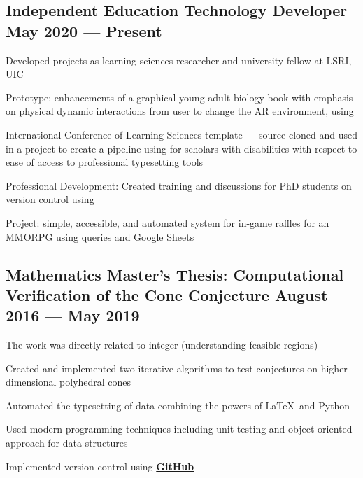 \documentclass[letter,10pt]{article}
\begin{document}
\subsection{Independent Education Technology Developer \hfill May 2020 --- Present}
\begin{zitemize}
\item Developed projects as learning sciences researcher and university fellow at LSRI, UIC
\item Prototype:  enhancements of a graphical young adult biology book with emphasis on physical dynamic interactions from user to change the AR environment, using 
\item International Conference of Learning Sciences \skills{\LaTeX} template --- source cloned and used in a project to create a pipeline using  for scholars with disabilities with respect to ease of access to professional typesetting tools
\item Professional Development: Created training and discussions for PhD students on version control using  
\item Project: simple, accessible, and automated system for in-game raffles for an MMORPG using  queries and Google Sheets
\end{zitemize}


\subsection{Mathematics Master's Thesis: Computational Verification of the Cone Conjecture \hfill	August 2016 — May 2019}
\begin{zitemize}
\item The work was directly related to integer  (understanding feasible regions)
\item Created and implemented two iterative algorithms to test conjectures on higher dimensional polyhedral cones
\item Automated the typesetting of data combining the powers of \LaTeX\, and Python
\item Used modern programming techniques including unit testing and object-oriented approach for data structures
\item Implemented version control using \href{https://github.com/TimmyChan/ConeThesis}{\bfseries{GitHub}} \end{zitemize}
\end{document}
